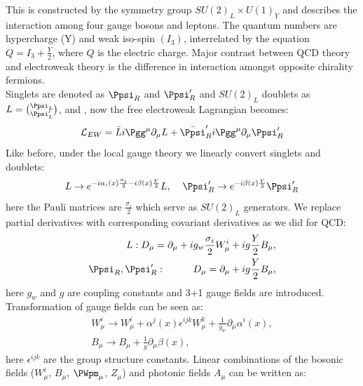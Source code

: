 This is constructed by the symmetry group $SU(2)_L \times U(1)_Y$ and describes the interaction among four gauge bosons and leptons. The quantum numbers are hypercharge (Y) and weak iso-spin $(I_3)$, interrelated by the equation $Q=I_3 + \frac{Y}{2}$, where $Q$ is the electric charge. Major contrast between QCD theory and electroweak theory is the difference in interaction amongst opposite chirality fermions.\\
Singlets are denoted as $\Ppsi_R$ and $\Ppsi^{\prime}_R$ and $SU(2)_L$ doublets as $L=\binom{\Ppsi_L}{\Ppsi^{\prime}_{L}}$, and , now the free electroweak Lagrangian becomes:
\begin{equation}
    \mathcal{L}_{EW}=\bar{L}i\Pgg^{\mu}\partial_{\mu}L + \bar{\Ppsi}^\prime_R i \Pgg^{\mu}\partial_{\mu}\Ppsi^\prime_R
\end{equation}
Like before, under the local gauge theory we linearly convert singlets and doublets:
\begin{equation}
    L \rightarrow e^{-i\alpha_i (x) \frac{\sigma_i}{2}-i\beta(x)\frac{Y}{2}} L, \hspace{4mm} \Ppsi^\prime_R \rightarrow e^{-i\beta(x)\frac{Y}{2}}\Ppsi^\prime_R
\end{equation}
here the Pauli matrices are $\frac{\sigma_i}{2}$ which serve as $SU(2)_L$ generators. We replace partial derivatives with corresponding covariant derivatives as we did for QCD:
\begin{equation}
\begin{aligned}
    L:  D_\mu = \partial_\mu + i g_w \frac{\sigma_i}{2} W^i_\mu + ig\frac{Y}{2} B_\mu,\\
    \Ppsi_R,\Ppsi^\prime_R: \hspace{10mm} D_\mu=\partial_\mu +ig\frac{Y}{2}B_\mu,
\end{aligned}
\label{eqn:sp}
\end{equation}
here $g_w$ and $g$ are coupling constants and 3+1 gauge fields are introduced. Transformation of gauge fields can be seen as:
\begin{equation}
\begin{aligned}
    W^i_\mu \rightarrow W^i_\mu + \alpha^j(x)\epsilon^{ijk}W^k_\mu + \frac{1}{g_w}\partial_\mu \alpha^i(x),\\
    B_\mu \rightarrow B_\mu + \frac{1}{g}\partial_\mu \beta(x),
\end{aligned}
\end{equation}
here $\epsilon^{ijk}$ are the group structure constants. Linear combinations of the bosonic fields ($W^i_\mu$, $B_\mu$, $\PWpm_\mu$, $Z_\mu$) and photonic fields $A_\mu$ can be written as:
